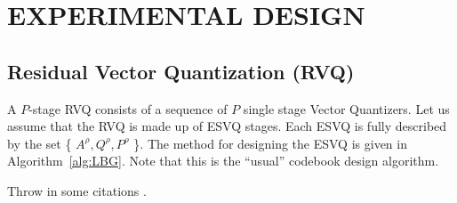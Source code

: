 %
%
%
%

\chapter{EXPERIMENTAL DESIGN}\label{ch:experimental-design}

\section{Residual Vector Quantization (RVQ)}

A $P$-stage RVQ consists of a sequence of $P$ single stage Vector
Quantizers.  Let us assume that the RVQ is made up of ESVQ stages.
Each ESVQ is fully described by the set \{ $A^{\rho}, Q^{\rho},
P^{\rho}$ \}.  The method for designing the ESVQ is given in
Algorithm~\ref{alg:LBG}.  Note that this is the ``usual'' codebook
design algorithm.%


Throw in some citations \cite{shucker,tbrady,moon,bar1}.


